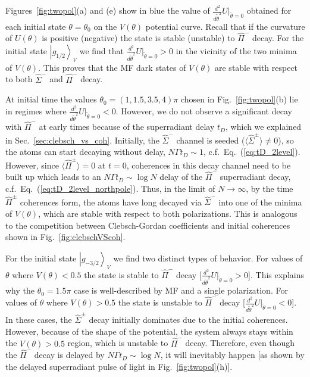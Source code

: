 \documentclass[aps,prx,superscriptaddress,twocolumn,notitlepage,nofootinbib,longbibliography]{revtex4-2}
\newcommand{\ket}[1]{\left|#1\right>}
\begin{document}
Figures~\ref{fig:twopol}(a) and (e) show in blue the value of $\frac{d^2}{d\tilde\theta^2}U\big|_{\tilde\theta=0}$ obtained for each initial state $\theta=\theta_0$ on the $V(\theta)$ potential curve.
Recall that if the curvature of $U(\theta)$ is positive (negative) the state is stable (unstable) to $\hat{\Pi}^-$ decay.
For the initial state $\ket{g_{1/2}}_V$ we find that $\frac{d^2}{d\tilde\theta^2}U\big|_{\tilde\theta=0}>0$ in the vicinity of the two minima of $V(\theta)$. This proves that the MF dark states of $V(\theta)$ are stable with respect to both $\hat{\Sigma}^-$ and $\hat{\Pi}^-$ decay.

At initial time the values $\theta_0=(1,1.5,3.5,4)\pi$ chosen in Fig.~\ref{fig:twopol}(b) lie in regimes where $\frac{d^2}{d\tilde\theta^2}U\big|_{\tilde\theta=0}<0$.
However, we do not observe a significant decay with $\hat{\Pi}^-$ at early times because of the  superradiant delay $t_D$, which we explained in Sec.~\ref{sec:clebsch_vs_coh}. Initially, the $\hat{\Sigma}^-$ channel is seeded ($\langle \hat{\Sigma}^\pm \rangle\neq0$), so the atoms can start decaying without delay, $N\Gamma t_D\sim1$, c.f.~Eq.~(\ref{eq:tD_2level}). However, since $\langle \hat{\Pi}^\pm \rangle=0$ at $t=0$, coherences in this decay channel need to be built up which leads to an $N\Gamma t_D\sim\log N$ delay of the $\hat{\Pi}^-$ superradiant decay, c.f.~Eq.~(\ref{eq:tD_2level_northpole}). Thus, in the limit of $N\rightarrow\infty$, by the time $\hat{\Pi}^\pm$ coherences form, the atoms have long decayed via $\hat{\Sigma}^-$ into one of the minima of $V(\theta)$, which are stable with respect to both polarizations. This is analogous to the competition between Clebsch-Gordan coefficients and initial coherences shown in Fig.~\ref{fig:clebschVScoh}.

For the initial state $\ket{g_{-3/2}}_V$ we find two distinct types of behavior. For values of $\theta$ where $V(\theta)<0.5$ the state is stable to $\hat{\Pi}^-$ decay [$\frac{d^2}{d\tilde\theta^2}U\big|_{\tilde\theta=0}>0$]. This explains why the $\theta_0=1.5\pi$ case is well-described by MF and a single polarization.
For values of $\theta$ where $V(\theta)>0.5$ the state is unstable to $\hat{\Pi}^-$ decay [$\frac{d^2}{d\tilde\theta^2}U\big|_{\tilde\theta=0}<0$].
In these cases, the $\hat{\Sigma}^\pm$ decay initially dominates due to the initial coherences. However, because of the shape of the potential, the system always stays within the $V(\theta)>0.5$ region, which is unstable to $\hat{\Pi}^-$ decay.
Therefore, even though the $\hat{\Pi}^-$ decay is delayed by $N\Gamma t_D\sim \log N$, it will inevitably happen [as shown by the delayed superradiant pulse of light in Fig.~\ref{fig:twopol}(h)].
\end{document}
